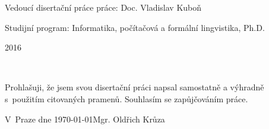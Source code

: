 \documentclass[12pt,notitlepage]{report}
\begin{document}
\begin{titlepage}
\large
\noindent Vedoucí disertační práce práce: Doc. Vladislav Kuboň

\noindent Studijní program: Informatika, počítačová a formální lingvistika, Ph.D.

\vspace{20mm}

\begin{center}
2016
\end{center}

\end{titlepage} %

\thispagestyle{empty} %
\normalsize %
\ \vspace{10mm} 


\vspace{\fill} %
\noindent Prohlašuji, že jsem svou disertační práci napsal samostatně a výhradně s~použitím citovaných pramenů. Souhlasím se zapůjčováním práce.

\bigskip
\noindent V~Praze dne \today \hspace{\fill}Mgr. Oldřich Krůza

\setcounter{page}{2} %
\tableofcontents %

\newpage %



\newpage













\end{document}
